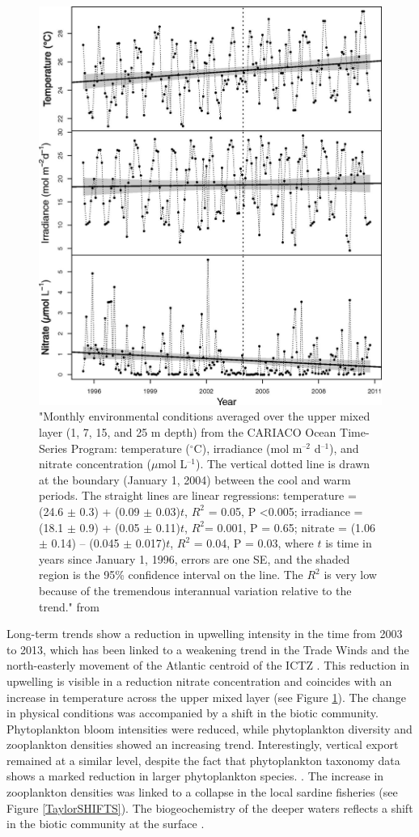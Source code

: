 \begin{figure}
\centering
\includegraphics[trim = 0mm 0mm 0mm 0mm, clip, width=0.7\linewidth]{./Chp1-Intro/IRWIN_F1.large.jpg}
\caption[Scheme]{\small {"Monthly environmental conditions averaged over the upper mixed layer (1, 7, 15, and 25 m depth) from the CARIACO Ocean Time-Series Program: temperature ($^\circ$C), irradiance (mol m$^{–2}$ d$^{–1}$), and nitrate concentration ($\mu$mol L$^{–1}$). The vertical dotted line is drawn at the boundary (January 1, 2004) between the cool and warm periods. The straight lines are linear regressions: temperature = (24.6 $\pm$ 0.3) + (0.09 $\pm$ 0.03)$t$, $R^2$ = 0.05, P \textless 0.005; irradiance = (18.1 $\pm$ 0.9) + (0.05 $\pm$ 0.11)$t$, $R^2$= 0.001, P = 0.65; nitrate = (1.06 $\pm$ 0.14) – (0.045 $\pm$ 0.017)$t$, $R^2$ = 0.04, P = 0.03, where $t$ is time in years since January 1, 1996, errors are one SE, and the shaded region is the 95\% confidence interval on the line. The $R^2$ is very low because of the tremendous interannual variation relative to the trend." from \cite{Irwin2015}}}
\label{CARIACOTaylorTrends}
\end{figure}

Long-term trends show a reduction in upwelling intensity in the time from 2003 to 2013, which has been linked to a weakening trend in the Trade Winds and the north-easterly movement of the Atlantic centroid of the ICTZ \citep{Taylor2012}. This reduction in upwelling is visible in a reduction nitrate concentration and coincides with an increase in temperature across the upper mixed layer (see Figure \ref{CARIACOTaylorTrends}). The change in physical conditions was accompanied by a shift in the biotic community. Phytoplankton bloom intensities were reduced, while phytoplankton diversity and zooplankton densities showed an increasing trend. Interestingly, vertical export remained at a similar level, despite the fact that phytoplankton taxonomy data shows a marked reduction in larger phytoplankton species. \citep{Taylor2012,Pinckney2015}. The increase in zooplankton densities was linked to a collapse in the local sardine fisheries (see Figure \ref{TaylorSHIFTS}). The biogeochemistry of the deeper waters reflects a shift in the biotic community at the surface \citep{Scranton2014}. 

